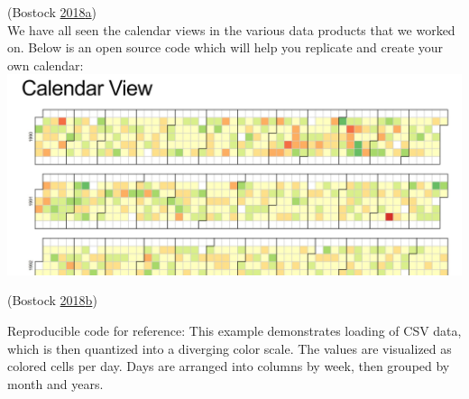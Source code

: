 \documentclass[]{book}
\begin{document}
(Bostock \protect\hyperlink{ref-Calendar_Layout}{2018}\protect\hyperlink{ref-Calendar_Layout}{a})\\
We have all seen the calendar views in the various data products that we worked on. Below is an open source code which will help you replicate and create your own calendar:
\includegraphics{images/CalendarView.jpg}

(Bostock \protect\hyperlink{ref-CalendarView}{2018}\protect\hyperlink{ref-CalendarView}{b})

Reproducible code for reference:
This example demonstrates loading of CSV data, which is then quantized into a diverging color scale. The values are visualized as colored cells per day. Days are arranged into columns by week, then grouped by month and years.
\end{document}
